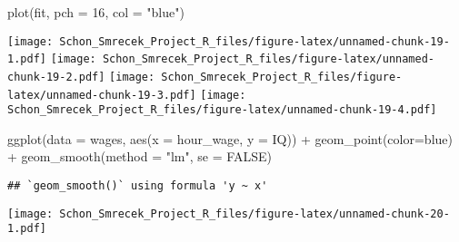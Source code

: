 \documentclass[
]{article}
\newenvironment{Shaded}{\begin{snugshade}}{\end{snugshade}}
\newcommand{\AttributeTok}[1]{\textcolor[rgb]{0.77,0.63,0.00}{#1}}
\newcommand{\ConstantTok}[1]{\textcolor[rgb]{0.00,0.00,0.00}{#1}}
\newcommand{\DecValTok}[1]{\textcolor[rgb]{0.00,0.00,0.81}{#1}}
\newcommand{\FunctionTok}[1]{\textcolor[rgb]{0.00,0.00,0.00}{#1}}
\newcommand{\NormalTok}[1]{#1}
\newcommand{\SpecialCharTok}[1]{\textcolor[rgb]{0.00,0.00,0.00}{#1}}
\newcommand{\StringTok}[1]{\textcolor[rgb]{0.31,0.60,0.02}{#1}}
\begin{document}
\begin{Shaded}
\begin{Highlighting}[]
\FunctionTok{plot}\NormalTok{(fit, }\AttributeTok{pch =} \DecValTok{16}\NormalTok{, }\AttributeTok{col =} \StringTok{"blue"}\NormalTok{)}
\end{Highlighting}
\end{Shaded}

\texttt{[image: Schon\_Smrecek\_Project\_R\_files/figure-latex/unnamed-chunk-19-1.pdf]}
\texttt{[image: Schon\_Smrecek\_Project\_R\_files/figure-latex/unnamed-chunk-19-2.pdf]}
\texttt{[image: Schon\_Smrecek\_Project\_R\_files/figure-latex/unnamed-chunk-19-3.pdf]}
\texttt{[image: Schon\_Smrecek\_Project\_R\_files/figure-latex/unnamed-chunk-19-4.pdf]}

\begin{Shaded}
\begin{Highlighting}[]
\FunctionTok{ggplot}\NormalTok{(}\AttributeTok{data =}\NormalTok{ wages, }\FunctionTok{aes}\NormalTok{(}\AttributeTok{x =}\NormalTok{ hour\_wage, }\AttributeTok{y =}\NormalTok{ IQ)) }\SpecialCharTok{+} 
  \FunctionTok{geom\_point}\NormalTok{(}\AttributeTok{color=}\StringTok{\textquotesingle{}blue\textquotesingle{}}\NormalTok{) }\SpecialCharTok{+}
  \FunctionTok{geom\_smooth}\NormalTok{(}\AttributeTok{method =} \StringTok{"lm"}\NormalTok{, }\AttributeTok{se =} \ConstantTok{FALSE}\NormalTok{)}
\end{Highlighting}
\end{Shaded}

\begin{verbatim}
## `geom_smooth()` using formula 'y ~ x'
\end{verbatim}

\texttt{[image: Schon\_Smrecek\_Project\_R\_files/figure-latex/unnamed-chunk-20-1.pdf]}
\end{document}
